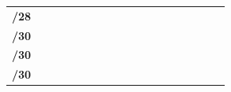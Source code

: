 \documentclass[11pt,a4paper]{report}
\begin{document}
\begin{center}
\begin{longtable}{rlcccccccccccccccc}
            \textbf{/28}                                                                                             &                       &                           &                           &                           &                           &                           &                            &                            &                            & \cellcolor[HTML]{BFBFBF}        & \cellcolor[HTML]{BFBFBF}        &                                 &                                 &                                 &                                 &                                  &                                 \\ \cline{3-18}
            \textbf{/30}                                                                                             &                       &                           &                           &                           &                           &                           &                            & \cellcolor[HTML]{C09FE5}   & \cellcolor[HTML]{C09FE5}   &                                 &                                 &                                 &                                 &                                 &                                 &                                  &                                 \\ \cline{3-18}
            \textbf{/30}                                                                                             &                       &                           &                           &                           &                           & \cellcolor[HTML]{C09FE5}  & \cellcolor[HTML]{C09FE5}   &                            &                            &                                 &                                 &                                 &                                 &                                 &                                 &                                  &                                 \\ \cline{3-18}
            \textbf{/30}                                                                                             &                       &                           &                           & \cellcolor[HTML]{C09FE5}  & \cellcolor[HTML]{C09FE5}  &                           &                            &                            &                            &                                 &                                 &                                 &                                 &                                 &                                 &                                  &                                 \\ \cline{3-18}

\end{longtable}
\end{center}
\end{document}
